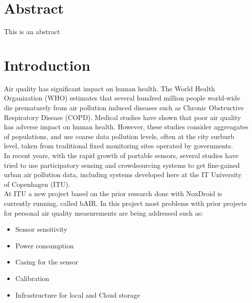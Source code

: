 \documentclass{ituthesis}
\begin{document}

\frontmatter

\thetitlepage
\newpage

\chapter*{Abstract}
This is an abstract

\cleardoublepage
\setcounter{tocdepth}{1}
\tableofcontents

\mainmatter

\midsloppy
\sloppybottom

\chapter{Introduction}
\label{ch:introduction}


Air quality has significant impact on human health. The World Health Organization (WHO) estimates that several hundred million people world-wide die prematurely from air pollution induced diseases such as Chronic Obstructive Respiratory Disease (COPD). Medical studies have shown that poor air quality has adverse impact on human health. However, these studies consider aggreagates of populations, and use coarse data pollution levels, often at the city surburb level, taken from traditional fixed monitoring sites operated by governments.\\

In recent years, with the rapid growth of portable sensors, several studies have tried to use participatory sensing and crowdsourcing systems to get fine-gained urban air pollution data, including systems developed here at the IT University of Copenhagen (ITU). \\

At ITU a new project based on the prior research done with NoxDroid is currently running, called bAIR. In this project most problems with prior projects for personal air quality measurements are being addressed such as: 

\begin{itemize}
\item Sensor sensitivity 
\item Power consumption 
\item Casing for the sensor 
\item Calibration 
\item Infrastructure for local and Cloud storage 
\end{itemize}
\end{document}
